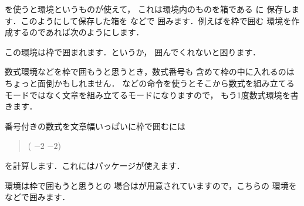 を使うと環境というものが使えて，
これは環境内のものを箱である に
保存します．このようにして保存した箱を などで
囲みます．例えばを枠で囲む
環境を作成するのであれば次のようにします．

\begin{InTeX}
\newenvironment{fminipage}%
  {\begin{Sbox}\begin{minipage}}%
  {\end{minipage}\end{Sbox}\fbox{\TheSbox}}
\end{InTeX}


\begin{InOut}
\newenvironment{fminipage}%
  {\begin{Sbox}\begin{minipage}}%
  {\end{minipage}\end{Sbox}%
   \fbox{\TheSbox}}
\begin{fminipage}{.8\linewidth}
この環境は枠で囲まれます．というか，
囲んでくれないと困ります．
\end{fminipage}
\end{InOut}

数式環境などを枠で囲もうと思うとき，数式番号も
含めて枠の中に入れるのはちょっと面倒かもしれません．
などの命令を使うとそこから数式を組み立てる
モードではなく文章を組み立てるモードになりますので，
もう1度数式環境を書きます．

番号付きの数式を文章幅いっぱいに枠で囲むには
\begin{quote}
 (  $-2$ $-2$)
\end{quote}
を計算します．これにはパッケージが使えます．
\begin{InOut}
\usepackage{calc,fancybox} 
\end{InOut}

環境は枠で囲もうと思うとの
場合はが用意されていますので，こちらの
環境を などで囲みます．
\begin{InOut}
\end{InOut}

